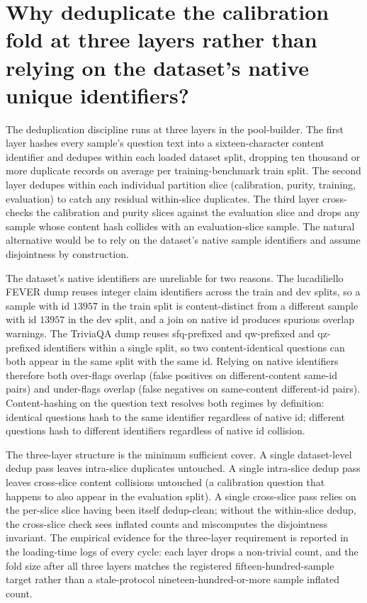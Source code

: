 
\section[Three-layer dedup]{Why deduplicate the calibration fold at three layers rather than relying on the dataset's native unique identifiers?}
\label{app:qa-three-layer-dedup}

The deduplication discipline runs at three layers in the pool-builder. The first layer hashes every sample's question text into a sixteen-character content identifier and dedupes within each loaded dataset split, dropping ten thousand or more duplicate records on average per training-benchmark train split. The second layer dedupes within each individual partition slice (calibration, purity, training, evaluation) to catch any residual within-slice duplicates. The third layer cross-checks the calibration and purity slices against the evaluation slice and drops any sample whose content hash collides with an evaluation-slice sample. The natural alternative would be to rely on the dataset's native sample identifiers and assume disjointness by construction.

The dataset's native identifiers are unreliable for two reasons. The lucadiliello FEVER dump reuses integer claim identifiers across the train and dev splits, so a sample with id $13957$ in the train split is content-distinct from a different sample with id $13957$ in the dev split, and a join on native id produces spurious overlap warnings. The TriviaQA dump reuses sfq-prefixed and qw-prefixed and qz-prefixed identifiers within a single split, so two content-identical questions can both appear in the same split with the same id. Relying on native identifiers therefore both over-flags overlap (false positives on different-content same-id pairs) and under-flags overlap (false negatives on same-content different-id pairs). Content-hashing on the question text resolves both regimes by definition: identical questions hash to the same identifier regardless of native id; different questions hash to different identifiers regardless of native id collision.

The three-layer structure is the minimum sufficient cover. A single dataset-level dedup pass leaves intra-slice duplicates untouched. A single intra-slice dedup pass leaves cross-slice content collisions untouched (a calibration question that happens to also appear in the evaluation split). A single cross-slice pass relies on the per-slice slice having been itself dedup-clean; without the within-slice dedup, the cross-slice check sees inflated counts and miscomputes the disjointness invariant. The empirical evidence for the three-layer requirement is reported in the loading-time logs of every cycle: each layer drops a non-trivial count, and the fold size after all three layers matches the registered fifteen-hundred-sample target rather than a stale-protocol nineteen-hundred-or-more sample inflated count.
